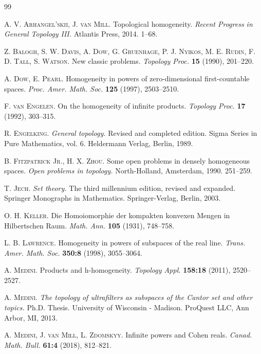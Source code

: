 \documentclass{amsart}
\theoremstyle{plain}
\theoremstyle{definition}
\begin{document}
\begin{thebibliography}{99}

\textsc{A. V. Arhangel'skii, J. van Mill.} Topological homogeneity. \emph{Recent Progress in General Topology III.} Atlantis Press, 2014. 1--68.

\textsc{Z. Balogh, S. W. Davis, A. Dow, G. Gruenhage, P. J. Nyikos, M. E. Rudin, F. D. Tall, S. Watson.} New classic problems. \emph{Topology Proc.} \textbf{15} (1990), 201--220.

\textsc{A. Dow, E. Pearl.} Homogeneity in powers of zero-dimensional first-countable spaces. \emph{Proc. Amer. Math. Soc.} \textbf{125} (1997), 2503--2510.

\textsc{F. van Engelen.} On the homogeneity of infinite products. \emph{Topology Proc.} \textbf{17} (1992), 303--315.

\textsc{R. Engelking.} \emph{General topology.} Revised and completed edition. Sigma Series in Pure Mathematics, vol. 6. Heldermann Verlag, Berlin, 1989.

\textsc{B. Fitzpatrick Jr., H. X. Zhou.} Some open problems in densely homogeneous spaces. \emph{Open problems in topology.} North-Holland, Amsterdam, 1990. 251--259.

\textsc{T. Jech.} \emph{Set theory.} The third millennium edition, revised and expanded. Springer Monographs in Mathematics. Springer-Verlag, Berlin, 2003.

\textsc{O. H. Keller.} Die Homoiomorphie der kompakten konvexen Mengen in Hilbertschen Raum. \emph{Math. Ann.} \textbf{105} (1931), 748--758.

\textsc{L. B. Lawrence.} Homogeneity in powers of subspaces of the real line. \emph{Trans. Amer. Math. Soc.} \textbf{350:8} (1998), 3055--3064.

\textsc{A. Medini.} Products and h-homogeneity. \emph{Topology Appl.} \textbf{158:18} (2011), 2520--2527.

\textsc{A. Medini.} \emph{The topology of ultrafilters as subspaces of the Cantor set and other topics.} Ph.D. Thesis. University of Wisconsin - Madison. ProQuest LLC, Ann Arbor, MI, 2013.

\textsc{A. Medini, J. van Mill, L. Zdomskyy.} Infinite powers and Cohen reals. \emph{Canad. Math. Bull.} \textbf{61:4} (2018), 812--821.


\end{thebibliography}
\end{document}
